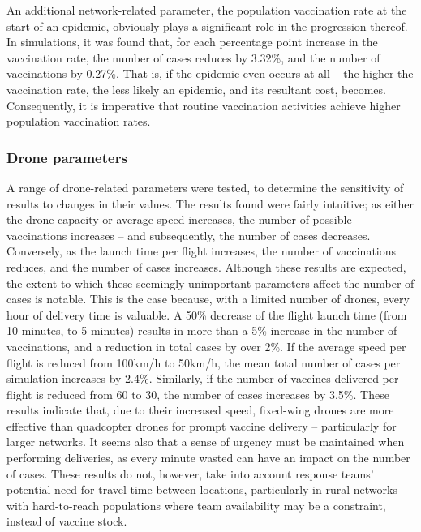 \documentclass[10pt,letterpaper]{article}
\begin{document}
An additional network-related parameter, the population vaccination rate at the start of an epidemic, obviously plays a significant role in the progression thereof. In simulations, it was found that, for each percentage point increase in the vaccination rate, the number of cases reduces by 3.32\%, and the number of vaccinations by 0.27\%. That is, if the epidemic even occurs at all -- the higher the vaccination rate, the less likely an epidemic, and its resultant cost, becomes. Consequently, it is imperative that routine vaccination activities achieve higher population vaccination rates.

\subsubsection*{Drone parameters}
A range of drone-related parameters were tested, to determine the sensitivity of results to changes in their values. The results found were fairly intuitive; as either the drone capacity or average speed increases, the number of possible vaccinations increases -- and subsequently, the number of cases decreases. Conversely, as the launch time per flight increases, the number of vaccinations reduces, and the number of cases increases. Although these results are expected, the extent to which these seemingly unimportant parameters affect the number of cases is notable. This is the case because, with a limited number of drones, every hour of delivery time is valuable. A 50\% decrease of the flight launch time (from 10 minutes, to 5 minutes) results in more than a 5\% increase in the number of vaccinations, and a reduction in total cases by over 2\%. If the average speed per flight is reduced from 100km/h to 50km/h, the mean total number of cases per simulation increases by 2.4\%. Similarly, if the number of vaccines delivered per flight is reduced from 60 to 30, the number of cases increases by 3.5\%. These results indicate that, due to their increased speed, fixed-wing drones are more effective than quadcopter drones for prompt vaccine delivery -- particularly for larger networks. It seems also that a sense of urgency must be maintained when performing deliveries, as every minute wasted can have an impact on the number of cases. These results do not, however, take into account response teams' potential need for travel time between locations, particularly in rural networks with hard-to-reach populations where team availability may be a constraint, instead of vaccine stock.

\end{document}

